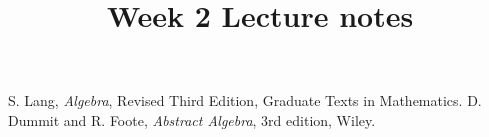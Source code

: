\documentclass[a4paper, reqno, 12pt]{amsart}
\theoremstyle{definition}
\numberwithin{equation}{section}
\numberwithin{thm}{section}
\begin{document}
\title[]{Week 2 Lecture notes }

\maketitle
\tableofcontents

\begin{thebibliography}{}
    S. Lang, {\em Algebra}, Revised Third Edition, Graduate Texts in Mathematics.
    D. Dummit and R. Foote, {\em Abstract Algebra}, 3rd edition, Wiley.

\end{thebibliography}
\end{document}
